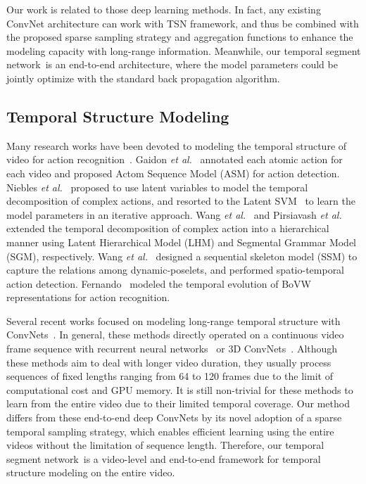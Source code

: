\documentclass[10pt,journal,compsoc]{IEEEtran}
\newcommand{\SEGNET}{temporal segment network}
\begin{document}
Our work is related to those deep learning methods. In fact, any existing ConvNet architecture can work with TSN framework, and thus be combined with the proposed sparse sampling strategy and aggregation functions to enhance the modeling capacity with long-range information. Meanwhile, our \SEGNET~is an end-to-end architecture, where the model parameters could be jointly optimize with the standard back propagation algorithm.

\subsection{Temporal Structure Modeling}

Many research works have been devoted to modeling the temporal structure of video for action recognition~\cite{NieblesCF10,GaidonHS13,WangQT14a,PirsiavashR14,WangQT14b,FernandoGMGT15}. Gaidon \emph{et al.}~\cite{GaidonHS13} annotated each atomic action for each video and proposed Actom Sequence Model (ASM) for action detection. Niebles \emph{et al.}~\cite{NieblesCF10} proposed to use latent variables to model the temporal decomposition of complex actions, and resorted to the Latent SVM~\cite{FelzenszwalbGMR10} to learn the model parameters in an iterative approach. Wang \emph{et al.}~\cite{WangQT14a} and Pirsiavash \emph{et al.}~\cite{PirsiavashR14} extended the temporal decomposition of complex action into a hierarchical manner using Latent Hierarchical Model (LHM) and Segmental Grammar Model (SGM), respectively. Wang \emph{et al.}~\cite{WangQT14b} designed a sequential skeleton model (SSM) to capture the relations among dynamic-poselets, and performed spatio-temporal action detection. Fernando~\cite{FernandoGMGT15} modeled the temporal evolution of BoVW representations for action recognition. 

Several recent works focused on modeling long-range temporal structure with ConvNets~\cite{Ng15,varol,DonahueJ2015}. In general, these methods directly operated on a continuous video frame sequence with recurrent neural networks~\cite{Ng15,DonahueJ2015,WuWJYX15} or 3D ConvNets~\cite{varol}. Although these methods aim to deal with longer video duration, they usually process sequences of fixed lengths ranging from 64 to 120 frames due to the limit of computational cost and GPU memory. It is still non-trivial for these methods to learn from the entire video due to their limited temporal coverage. Our method differs from these end-to-end deep ConvNets by its novel adoption of a sparse temporal sampling strategy, which enables efficient learning using the entire videos without the limitation of sequence length. Therefore, our \SEGNET~is a video-level and end-to-end framework for temporal structure modeling on the entire video.
\end{document}
